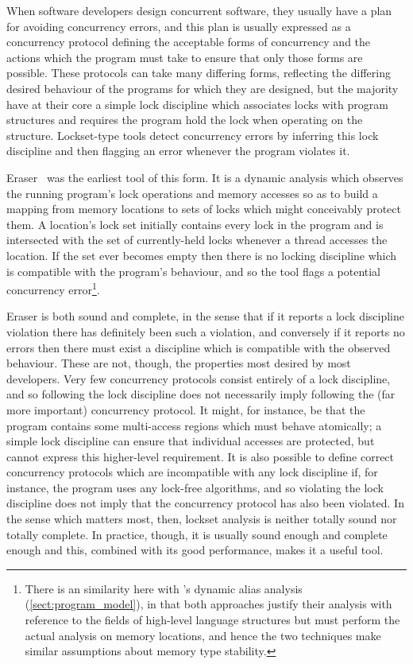 When software developers design concurrent software, they usually have
a plan for avoiding concurrency errors, and this plan is usually
expressed as a concurrency protocol defining the acceptable forms of
concurrency and the actions which the program must take to ensure that
only those forms are possible.  These protocols can take many
differing forms, reflecting the differing desired behaviour of the
programs for which they are designed, but the majority have at their
core a simple lock discipline which associates locks with program
structures and requires the program hold the lock when operating on
the structure.  Lockset-type tools detect concurrency errors by
inferring this lock discipline and then flagging an error whenever the
program violates it.

Eraser~\cite{Savage1997} was the earliest tool of this form.  It is a
dynamic analysis which observes the running program's lock operations
and memory accesses so as to build a mapping from memory locations to
sets of locks which might conceivably protect them.  A location's lock
set initially contains every lock in the program and is intersected
with the set of currently-held locks whenever a thread accesses the
location.  If the set ever becomes empty then there is no locking
discipline which is compatible with the program's behaviour, and so
the tool flags a potential concurrency error\footnote{There is an
  similarity here with {\technique}'s dynamic alias analysis
  (\autoref{sect:program_model}), in that both approaches justify
  their analysis with reference to the fields of high-level language
  structures but must perform the actual analysis on memory locations,
  and hence the two techniques make similar assumptions about memory
  type stability.}.\poorstyle

Eraser is both sound and complete, in the sense that if it reports a
lock discipline violation there has definitely been such a violation,
and conversely if it reports no errors then there must exist a
discipline which is compatible with the observed behaviour.  These are
not, though, the properties most desired by most developers.  Very few
concurrency protocols consist entirely of a lock discipline, and so
following the lock discipline does not necessarily imply following the
(far more important) concurrency protocol.  It might, for instance, be
that the program contains some multi-access regions which must behave
atomically; a simple lock discipline can ensure that individual
accesses are protected, but cannot express this higher-level
requirement.  It is also possible to define correct concurrency
protocols which are incompatible with any lock discipline if, for
instance, the program uses any lock-free algorithms, and so violating
the lock discipline does not imply that the concurrency protocol has
also been violated.  In the sense which matters most, then, lockset
analysis is neither totally sound nor totally complete.  In practice,
though, it is usually sound enough and complete enough and this,
combined with its good performance, makes it a useful tool.

